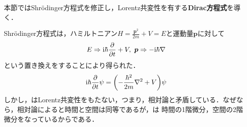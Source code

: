 \documentclass{report}
\begin{document}
本節ではShrödinger方程式を修正し，Lorentz共変性を有する\textbf{Dirac方程式}を導く．

Shrödinger方程式は，ハミルトニアン$H=\frac{\bm{p}^2}{2m} + V=E$と運動量$\bm{p}$に対して
\begin{align}
  E \Rightarrow \mathrm{i}\hbar\frac{\partial}{\partial t} + V,\ \bm{p} \Rightarrow -\mathrm{i}\hbar \nabla 
\end{align}
という置き換えをすることにより得られた．
\begin{align}
  \mathrm{i}\hbar \frac{\partial}{\partial t}\psi = \qty(-\frac{\hbar^2}{2m}\nabla^2 + V)\psi   \label{TDSE}
\end{align}
しかし，はLorentz共変性をもたない，つまり，相対論と矛盾している．なぜなら，相対論によると時間と空間は同等であるが，は
時間の1階微分，空間の2階微分をなっているからである．
\end{document}
